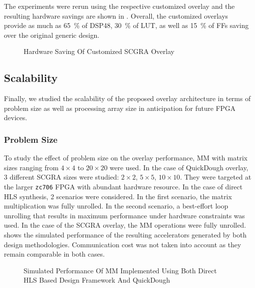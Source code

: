 The experiments were rerun using the respective customized overlay and the resulting hardware savings are shown in .  Overall, the customized overlays provide as much as \SI{65}{\percent} of DSP48, \SI{30}{\percent} of LUT, as well as \SI{15}{\percent} of FFs saving over the original generic design.

\begin{figure}
\caption{Hardware Saving Of Customized SCGRA Overlay}
\label{fig:hardware-saving}
\end{figure}


  
\subsection{Scalability} \label{subsec:scalability}
Finally, we studied the scalability of the proposed overlay architecture in terms of problem size as
well as processing array size in anticipation for future FPGA devices.

\subsubsection{Problem Size}
To study the effect of problem size on the overlay performance, MM with
matrix sizes ranging from $4\times 4$ to $20 \times 20$ were used. In the case of QuickDough
overlay, \num{3} different SCGRA sizes were studied: $2\times 2$, $5\times 5$, $10\times 10$. They
were targeted at the larger \texttt{zc706} FPGA with abundant hardware resource. In the case of
direct HLS synthesis, \num{2} scenarios were considered.  In the first scenario, the matrix
multiplication was fully unrolled. In the second scenario, a best-effort loop unrolling that results in
maximum performance under hardware constraints was used. In the case of the SCGRA overlay, the
MM operations were fully unrolled.  shows the simulated
performance of the resulting accelerators generated by both design methodologies. Communication
cost was not taken into account as they remain comparable in both cases.

\begin{figure}
\centering
{}
\qquad
{}
\caption{Simulated Performance Of MM Implemented Using Both Direct HLS Based Design Framework And QuickDough}
\label{fig:mm-sim-perf}
\end{figure}

